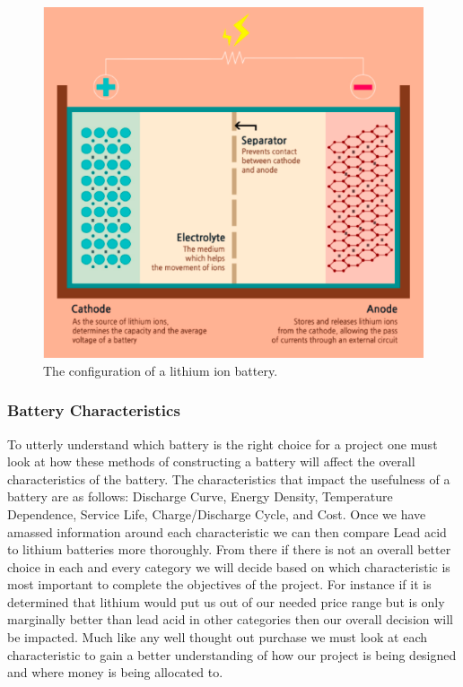 \begin{figure}
    \centering
    \includegraphics[scale=0.4]{figures/lithium ion battery.png}
    \caption{The configuration of a lithium ion battery.}
    \label{lithium-ion-battery} 
\end{figure}

\subsubsection{Battery Characteristics}
To utterly understand which battery is the right choice for a project one must look at how these methods of constructing a battery will affect the overall characteristics of the battery. The characteristics that impact the usefulness of a battery are as follows: Discharge Curve, Energy Density, Temperature Dependence, Service Life, Charge/Discharge Cycle, and Cost. Once we have amassed information around each characteristic we can then compare Lead acid to lithium batteries more thoroughly. From there if there is not an overall better choice in each and every category we will decide based on which characteristic is most important to complete the objectives of the project. For instance if it is determined that lithium would put us out of our needed price range but is only marginally better than lead acid in other categories then our overall decision will be impacted. Much like any well thought out purchase we must look at each characteristic to gain a better understanding of how our project is being designed and where money is being allocated to.

